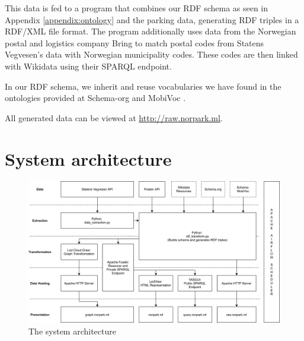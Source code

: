 \vspace{5mm}

This data is fed to a program that combines our RDF schema as seen in Appendix \ref{appendix:ontology} and the parking data, generating RDF triples in a RDF/XML file format. The program additionally uses data from the Norwegian postal and logistics company Bring \cite{bring} to match postal codes from Statens Vegvesen's data with Norwegian municipality codes. These codes are then linked with Wikidata \cite{wikidata} using their SPARQL endpoint.

\vspace{5mm}

In our RDF schema, we inherit and reuse vocabularies we have found in the ontologies provided at Schema-org \cite{schema-org} and MobiVoc \cite{schema-mobivoc}. 

\vspace{5mm}

All generated data can be viewed at \url{http://raw.norpark.ml}.



\section{System architecture}

\begin{figure}[H]
	\centering
	\includegraphics[width=\linewidth]{figures/system-architecture.png}
	\caption{The system architecture}
\end{figure}



